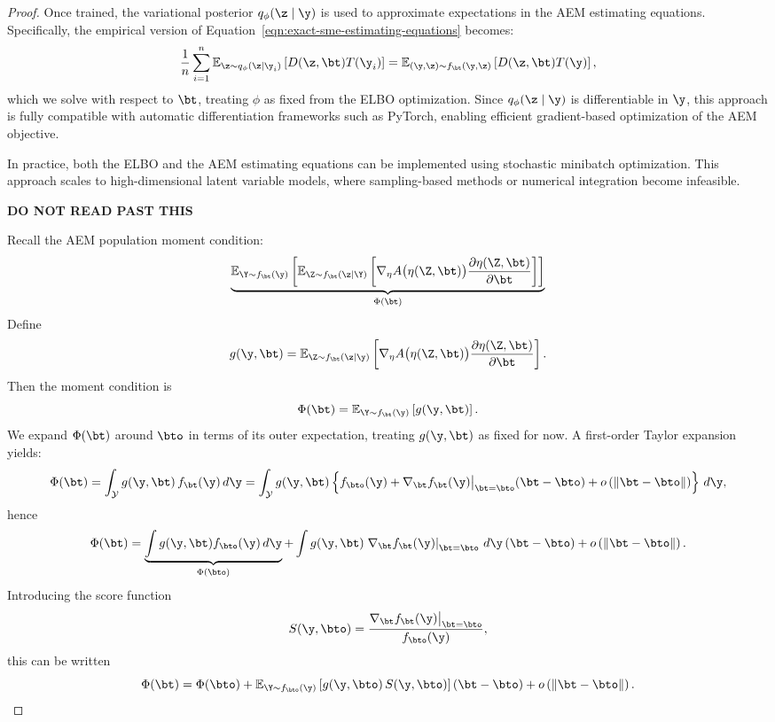 \begin{proof}
Once trained, the variational posterior \( q_\phi(\z \mid \y) \) is used to approximate expectations in the AEM estimating equations. Specifically, the empirical version of Equation~\eqref{eqn:exact-sme-estimating-equations} becomes:
\[
\frac{1}{n} \sum_{i=1}^n \mathbb{E}_{\z \sim q_\phi(\z \mid \y_i)} \left[ D(\z, \bt) T(\y_i) \right] = \mathbb{E}_{(\y, \z) \sim f_\bt(\y, \z)} \left[ D(\z, \bt) T(\y) \right],
\]
which we solve with respect to \( \bt \), treating \( \phi \) as fixed from the ELBO optimization. Since \( q_\phi(\z \mid \y) \) is differentiable in \( \y \), this approach is fully compatible with automatic differentiation frameworks such as PyTorch, enabling efficient gradient-based optimization of the AEM objective.

In practice, both the ELBO and the AEM estimating equations can be implemented using stochastic minibatch optimization. This approach scales to high-dimensional latent variable models, where sampling-based methods or numerical integration become infeasible.


\newpage



\vspace*{\fill}
\begin{center}
    {\Huge \bfseries DO NOT READ PAST THIS}
\end{center}
\vspace*{\fill}

\newpage

Recall the AEM population moment condition:
\[
\underbrace{
\mathbb{E}_{\Y \sim f_\bt(\y)}
\left[
    \mathbb{E}_{\Z \sim f_\bt(\z \mid \Y)}
    \left[
        \nabla_\eta A\bigl(\eta(\Z, \bt)\bigr)
        \frac{\partial \eta(\Z,\bt)}{\partial \bt}
    \right]
\right]
}_{\Phi(\bt)}
\]
Define
\[
g(\y,\bt) 
= 
\mathbb{E}_{\Z \sim f_\bt(\z \mid \y)}
\left[
    \nabla_\eta A\bigl(\eta(\Z,\bt)\bigr)
    \frac{\partial \eta(\Z,\bt)}{\partial \bt}
\right].
\]
Then the moment condition is
\[
\Phi(\bt) = \mathbb{E}_{\Y \sim f_\bt(\y)} \left[ g(\y,\bt) \right].
\]
We expand $\Phi(\bt)$ around $\bto$ in terms of its outer expectation, treating $g(\y,\bt)$ as fixed for now. A first-order Taylor expansion yields:
\[
\Phi(\bt)
=
\int_{\mathcal Y} g(\y,\bt) \, f_\bt(\y)\, d\y
=
\int_{\mathcal Y}
g(\y,\bt)
\left\{
f_{\bto}(\y)
+
\nabla_\bt f_\bt(\y)\bigr|_{\bt=\bto} (\bt - \bto)
+
o\left(\| \bt - \bto \|\right)
\right\}
\, d\y,
\]
hence
\[
\Phi(\bt)
=
\underbrace{
\int g(\y,\bt) f_{\bto}(\y)\, d\y
}_{\Phi(\bto)}
+
\int g(\y,\bt)
\left.
\nabla_\bt f_\bt(\y)
\right|_{\bt=\bto}
\, d\y
\, (\bt - \bto)
+
o\left(\| \bt - \bto \|\right).
\]
Introducing the score function
\[
S(\y, \bto) = \frac{ \nabla_\bt f_\bt(\y)\bigr|_{\bt=\bto} }{ f_{\bto}(\y) },
\]
this can be written
\[
\Phi(\bt)
=
\Phi(\bto)
+
\mathbb{E}_{\Y \sim f_{\bto}(\y)}
\left[
    g(\y,\bto) \, S(\y,\bto)
\right]
(\bt - \bto)
+
o\left( \| \bt - \bto \| \right).
\]


\end{proof}
